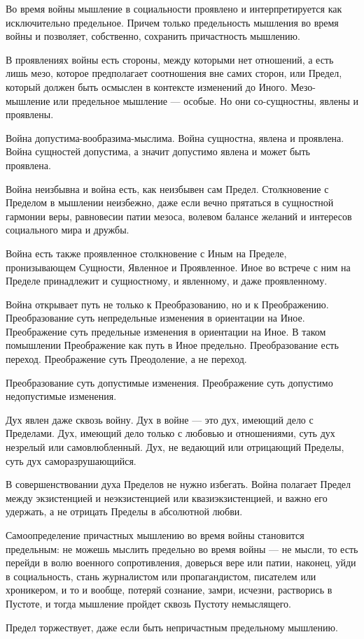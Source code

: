 Во время войны мышление в социальности проявлено и интерпретируется как
исключительно предельное. Причем только предельность мышления во время войны и
позволяет, собственно, сохранить причастность мышлению.

В проявлениях войны есть стороны, между которыми нет отношений, а есть лишь
мезо, которое предполагает соотношения вне самих сторон, или Предел, который
должен быть осмыслен в контексте изменений до Иного. Мезо-мышление или
предельное мышление — особые. Но они со-сущностны, явлены и проявлены.

Война допустима-вообразима-мыслима. Война сущностна, явлена и проявлена. Война
сущностей допустима, а значит допустимо явлена и может быть проявлена.

Война неизбывна и война есть, как неизбывен сам Предел. Столкновение с Пределом
в мышлении неизбежно, даже если вечно прятаться в сущностной гармонии веры,
равновесии патии мезоса, волевом балансе желаний и интересов социального мира и
дружбы.

Война есть также проявленное столкновение с Иным на Пределе, пронизывающем
Сущности, Явленное и Проявленное. Иное во встрече с ним на Пределе принадлежит
и сущностному, и явленному, и даже проявленному.

Война открывает путь не только к Преобразованию, но и к Преображению.
Преобразование суть непредельные изменения в ориентации на Иное. Преображение
суть предельные изменения в ориентации на Иное. В таком помышлении Преображение
как путь в Иное предельно. Преобразование есть переход. Преображение суть
Преодоление, а не переход.

Преобразование суть допустимые изменения. Преображение суть допустимо
недопустимые изменения.

Дух явлен даже сквозь войну. Дух в войне — это дух, имеющий дело с Пределами.
Дух, имеющий дело только с любовью и отношениями, суть дух незрелый или
самовлюбленный. Дух, не ведающий или отрицающий Пределы, суть дух
саморазрушающийся.

В совершенствовании духа Пределов не нужно избегать. Война полагает Предел
между экзистенцией и неэкзистенцией или квазиэкзистенцией, и важно его
удержать, а не отрицать Пределы в абсолютной любви.

Самоопределение причастных мышлению во время войны становится предельным: не
можешь мыслить предельно во время войны — не мысли, то есть перейди в волю
военного сопротивления, доверься вере или патии, наконец, уйди в социальность,
стань журналистом или пропагандистом, писателем или хроникером, и то и вообще,
потеряй сознание, замри, исчезни, растворись в Пустоте, и тогда мышление
пройдет сквозь Пустоту немыслящего.

Предел торжествует, даже если быть непричастным предельному мышлению.
